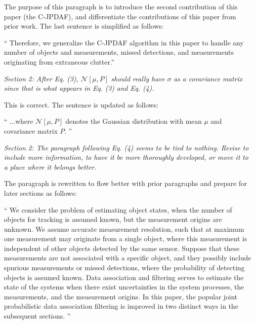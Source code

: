 \documentclass[11pt]{article}
\newenvironment{correction}{\begin{list}{}{\setlength{\leftmargin}{1cm}\setlength{\rightmargin}{1cm}}\vspace{\parsep}\item[]``}{''\end{list}}
\begin{document}
\begin{itemize}
The purpose of this paragraph is to introduce the second contribution of this paper (the C-JPDAF), and differentiate the contributions of this paper from prior work. The last sentence is simplified as follows:

\begin{correction}
Therefore, we generalize the C-JPDAF algorithm in this paper to handle any number of objects and measurements, missed detections, and measurements originating from extraneous clutter.\end{correction}

\item {\itshape Section 2:
After Eq. (3), $\mathcal N[\mu,P]$ should really have $\sigma$ as a covariance matrix since that is what appears in Eq. (3) and Eq. (4).}

This is correct. The sentence is updated as follows:

\begin{correction}
...where $\mathcal N[\mu,P]$ denotes the Gaussian distribution with mean $\mu$ and covariance matrix $P$.
\end{correction}

\item {\itshape Section 2:
The paragraph following Eq. (4) seems to be tied to nothing.  Revise to include more information, to have it be more thoroughly developed, or move it to a place where it belongs better.}

The paragraph is rewritten to flow better with prior paragraphs and prepare for later sections as follows:

\begin{correction}
We consider the problem of estimating object states, when the number of objects for tracking is assumed known, but the measurement origins are unknown.
We assume accurate measurement resolution, such that at maximum one measurement may originate from a single object, where this measurement is independent of other objects detected by the same sensor.
Suppose that these measurements are not associated with a specific object, and they possibly include spurious measurements or missed detections, where the probability of detecting objects is assumed known. Data association and filtering serves to estimate the state of the systems when there exist uncertainties in the system processes, the measurements, and the measurement origins. In this paper, the popular joint probabilistic data association filtering is improved in two distinct ways in the subsequent sections.
\end{correction}


\end{itemize}
\end{document}
